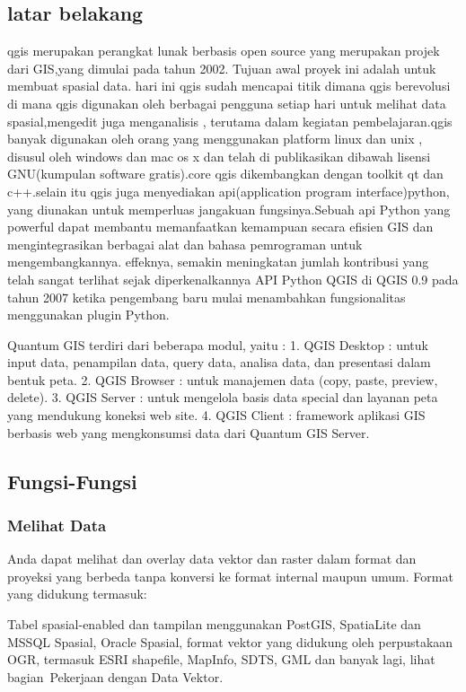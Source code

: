 \subsection{latar belakang}
 qgis merupakan perangkat lunak berbasis open source yang merupakan projek dari GIS,yang dimulai pada tahun 2002. Tujuan awal proyek ini adalah untuk membuat spasial data. hari ini qgis sudah mencapai titik dimana qgis berevolusi di mana qgis digunakan oleh berbagai pengguna setiap hari untuk melihat data spasial,mengedit juga menganalisis , terutama dalam kegiatan pembelajaran.qgis banyak digunakan oleh orang yang menggunakan platform linux dan unix , disusul oleh windows dan mac os x dan telah di publikasikan dibawah lisensi GNU(kumpulan software gratis).core qgis dikembangkan dengan toolkit qt dan c++.selain itu qgis juga menyediakan api(application program interface)python, yang diunakan untuk memperluas jangakuan fungsinya.Sebuah api Python yang powerful dapat membantu memanfaatkan kemampuan secara efisien GIS dan mengintegrasikan berbagai alat dan bahasa pemrograman untuk mengembangkannya. effeknya, semakin meningkatan jumlah kontribusi yang telah sangat terlihat sejak diperkenalkannya API Python QGIS di QGIS 0.9 pada tahun 2007 ketika pengembang baru mulai menambahkan fungsionalitas menggunakan plugin Python.

Quantum GIS terdiri dari beberapa modul, yaitu :
1.	QGIS Desktop : untuk input data, penampilan data, query data, analisa data, dan presentasi dalam bentuk peta.
2.	QGIS Browser : untuk manajemen data (copy, paste, preview, delete).
3.	QGIS Server : untuk mengelola basis data special dan layanan peta yang mendukung koneksi web site.
4.	QGIS Client : framework aplikasi GIS berbasis web yang mengkonsumsi data dari Quantum GIS Server.

\subsection{Fungsi-Fungsi}
\subsubsection {Melihat Data}
Anda dapat melihat dan overlay data vektor dan raster dalam format dan proyeksi yang berbeda tanpa konversi ke format internal maupun umum. Format yang didukung termasuk:

Tabel spasial-enabled dan tampilan menggunakan PostGIS, SpatiaLite dan MSSQL Spasial, Oracle Spasial, format vektor yang didukung oleh perpustakaan OGR, termasuk ESRI shapefile, MapInfo, SDTS, GML dan banyak lagi, lihat bagian Pekerjaan dengan Data Vektor.

